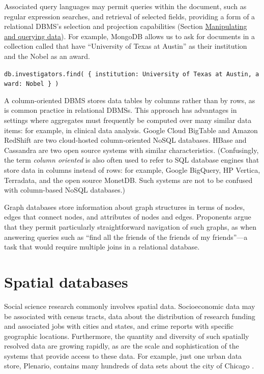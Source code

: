 \documentclass[]{krantz}
\begin{document}
Associated query languages may permit queries within the document, such
as regular expression searches, and retrieval of selected fields,
providing a form of a relational DBMS's selection and projection
capabilities (Section \protect\hyperlink{sec:db:sql}{Manipulating and
querying data}). For example, MongoDB allows us to ask for documents in
a collection called that have ``University of Texas at Austin'' as their
institution and the Nobel as an award.

\texttt{db.investigators.find(\ \{\ institution:\ \textquotesingle{}University\ of\ Texas\ at\ Austin\textquotesingle{},\ award:\ \textquotesingle{}Nobel\textquotesingle{}\ \}\ )}

A column-oriented DBMS stores data tables by columns rather than by
rows, as is common practice in relational DBMSs. This approach has
advantages in settings where aggregates must frequently be computed over
many similar data items: for example, in clinical data analysis. Google
Cloud BigTable and Amazon RedShift are two cloud-hosted column-oriented
NoSQL databases. HBase and Cassandra are two open source systems with
similar characteristics. (Confusingly, the term \emph{column oriented}
is also often used to refer to SQL database engines that store data in
columns instead of rows: for example, Google BigQuery, HP Vertica,
Terradata, and the open source MonetDB. Such systems are not to be
confused with column-based NoSQL databases.)

Graph databases store information about graph structures in terms of
nodes, edges that connect nodes, and attributes of nodes and edges.
Proponents argue that they permit particularly straightforward
navigation of such graphs, as when answering queries such as ``find all
the friends of the friends of my friends''---a task that would require
multiple joins in a relational database.

\hypertarget{sec:db:spatial}{\section{Spatial
databases}\label{sec:db:spatial}}

Social science research commonly involves spatial data. Socioeconomic
data may be associated with census tracts, data about the distribution
of research funding and associated jobs with cities and states, and
crime reports with specific geographic locations. Furthermore, the
quantity and diversity of such spatially resolved data are growing
rapidly, as are the scale and sophistication of the systems that provide
access to these data. For example, just one urban data store, Plenario,
contains many hundreds of data sets about the city of Chicago
\citep{plenario}.
\end{document}
